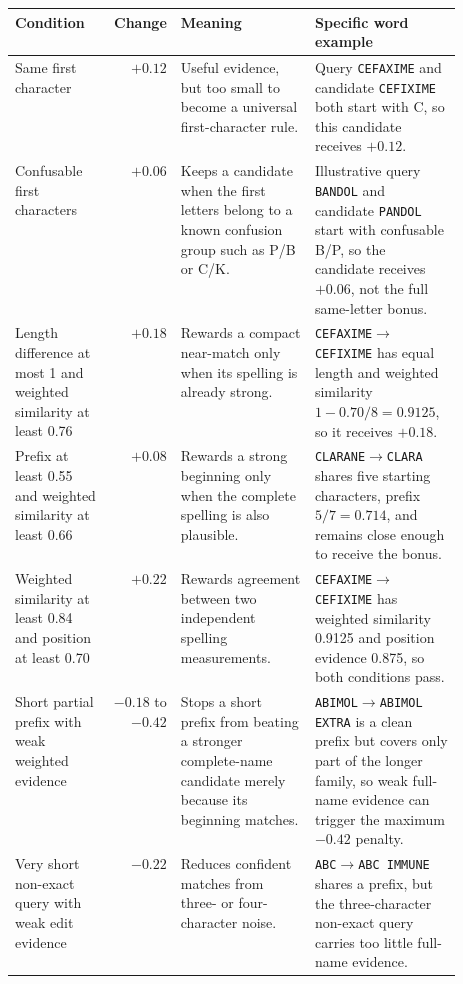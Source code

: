 \documentclass[11pt,a4paper]{article}
\newcommand{\code}[1]{\texttt{#1}}
\begin{document}
\begin{table}[H]
\centering
\small
\begin{tabularx}{\linewidth}{@{}L{0.22\linewidth}rL{0.30\linewidth}Y@{}}
\toprule
\textbf{Condition} & \textbf{Change} & \textbf{Meaning} & \textbf{Specific word example} \\
\midrule
Same first character & $+0.12$ & Useful evidence, but too small to become a universal first-character rule. & Query \code{CEFAXIME} and candidate \code{CEFIXIME} both start with C, so this candidate receives $+0.12$. \\
Confusable first characters & $+0.06$ & Keeps a candidate when the first letters belong to a known confusion group such as P/B or C/K. & Illustrative query \code{BANDOL} and candidate \code{PANDOL} start with confusable B/P, so the candidate receives $+0.06$, not the full same-letter bonus. \\
Length difference at most 1 and weighted similarity at least 0.76 & $+0.18$ & Rewards a compact near-match only when its spelling is already strong. & \code{CEFAXIME}$\rightarrow$\code{CEFIXIME} has equal length and weighted similarity $1-0.70/8=0.9125$, so it receives $+0.18$. \\
Prefix at least 0.55 and weighted similarity at least 0.66 & $+0.08$ & Rewards a strong beginning only when the complete spelling is also plausible. & \code{CLARANE}$\rightarrow$\code{CLARA} shares five starting characters, prefix $5/7=0.714$, and remains close enough to receive the bonus. \\
Weighted similarity at least 0.84 and position at least 0.70 & $+0.22$ & Rewards agreement between two independent spelling measurements. & \code{CEFAXIME}$\rightarrow$\code{CEFIXIME} has weighted similarity 0.9125 and position evidence 0.875, so both conditions pass. \\
Short partial prefix with weak weighted evidence & $-0.18$ to $-0.42$ & Stops a short prefix from beating a stronger complete-name candidate merely because its beginning matches. & \code{ABIMOL}$\rightarrow$\code{ABIMOL EXTRA} is a clean prefix but covers only part of the longer family, so weak full-name evidence can trigger the maximum $-0.42$ penalty. \\
Very short non-exact query with weak edit evidence & $-0.22$ & Reduces confident matches from three- or four-character noise. & \code{ABC}$\rightarrow$\code{ABC IMMUNE} shares a prefix, but the three-character non-exact query carries too little full-name evidence. \\

\end{tabularx}
\end{table}
\end{document}
